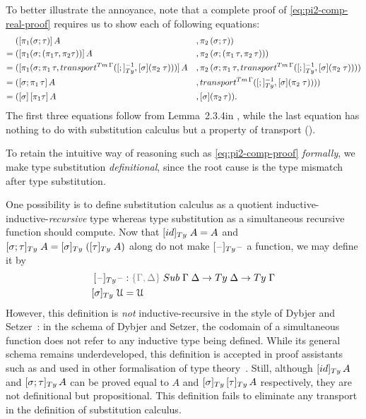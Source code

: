 \documentclass[a4paper,UKenglish,numberwithinsect,cleveref,thm-restate]{lipics-v2021}
\begin{document}
\begin{example}
  To better illustrate the annoyance, note that a complete proof of \eqref{eq:pi2-comp-real-proof} requires us to show each of following equations:
  \begin{alignat*}{3}
         & ([\pi_1(\sigma; \tau)]\,A                    &&, \pi_2\,(\sigma ; \tau)) \\
    = {} & ([\pi_1(\sigma; (\pi_1\tau , \pi_2\tau))]\,A &&, \pi_2\,(\sigma; (\pi_1\,\tau, \pi_2\,\tau))) \\
    = {} & ([\pi_1(\sigma;\pi_1\,\tau, \transfib{\Tm\,\Gamma}{[;]_{\Ty}^{-1}}{\color{black}[ \sigma ] (\pi_2\;\tau)})]\,A &&, \pi_2\,(\sigma;\pi_1\,\tau, \transfib{\Tm\,\Gamma}{[;]_{\Ty}^{-1}}{\color{black}[ \sigma ] (\pi_2\;\tau)})) \\
    = {} & ([\sigma;\pi_1\,\tau]\,A &&, \transfib{\Tm\,\Gamma}{[;]_{\Ty}^{-1}}{\color{black}[ \sigma ] (\pi_2\;\tau)})) \nonumber \\
    = {} & (\sub{\sigma}{\sub{\pi_1\tau}{A}} &&, [\sigma] (\pi_2\,\tau)). \nonumber
  \end{alignat*}
  The first three equations follow from Lemma~2.3.4in \cite{UFP2013}, while the last equation has nothing to do with substitution calculus but a property of transport (\cite[Lemma~2.3.2]{UFP2013}).
\end{example}

To retain the intuitive way of reasoning such as \eqref{eq:pi2-comp-proof} \emph{formally}, we make type substitution \emph{definitional}, since the root cause is the type mismatch after type substitution.

One possibility is to define substitution calculus as a quotient inductive-inductive-\emph{recursive} type whereas type substitution as a simultaneous recursive function should compute.
Now that $[ \idS ]_{\Ty}\;A = A$ and $[ \sigma ; \tau ]_{\Ty}\;A = [ \sigma ]_{\Ty}\;([ \tau ]_{\Ty}\;A)$ along do not make $[\blank]_{\Ty}\blank$ a function, we may define it by
\begin{alignat*}{3}
[\blank]_{\Ty} \blank &: \implicit{\Gamma, \Delta} \; \Sub\;\Gamma\;\Delta \to \Ty\;\Delta \to \Ty\;\Gamma \\
[ \sigma ]_{\Ty}\;\UU & = \UU
\end{alignat*}
However, this definition is \emph{not} inductive-recursive in the style of Dybjer and Setzer~\cite{Dybjer2000,Dybjer2003}: in the schema of Dybjer and Setzer, the codomain of a simultaneous function does not refer to any inductive type being defined.
While its general schema remains underdeveloped, this definition is accepted in proof assistants such as \Agda and used in other formalisation of type theory~\cite{Danielsson2006,Chapman2009}.
Still, although $[\idS]_{\Ty}\,A$ and $[\sigma; \tau]_{\Ty}\,A$ can be proved equal to $A$ and $[\sigma]_{\Ty}\,[\tau]_{\Ty}\,A$ respectively, they are not definitional but propositional.
This definition fails to eliminate any transport in the definition of substitution calculus.
\end{document}
